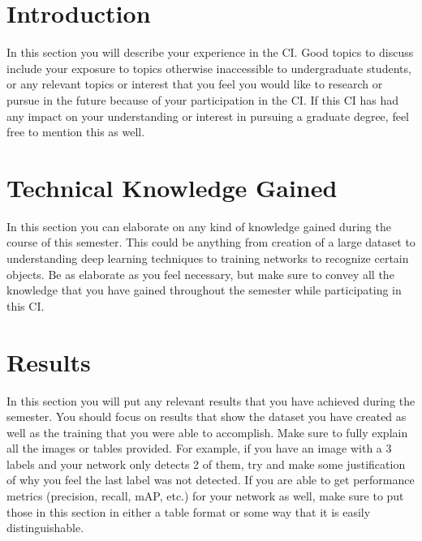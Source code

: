 \thispagestyle{empty}		%

\printtitle					%
\vfill
\printauthor				%
\newpage



\setcounter{page}{1}		%
\section{Introduction}

In this section you will describe your experience in the CI.  Good topics to discuss include your exposure to topics otherwise inaccessible to undergraduate students, or any relevant topics or interest that you feel you would like to research or pursue in the future because of your participation in the CI. If this CI has had any impact on your understanding or interest in pursuing a graduate degree, feel free to mention this as well.

\section{Technical Knowledge Gained}

In this section you can elaborate on any kind of knowledge gained during the course of this semester.  This could be anything from creation of a large dataset to understanding deep learning techniques to training networks to recognize certain objects.  Be as elaborate as you feel necessary, but make sure to convey all the knowledge that you have gained throughout the semester while participating in this CI.

\section{Results}

In this section you will put any relevant results that you have achieved during the semester.  You should focus on results that show the dataset you have created as well as the training that you were able to accomplish.  Make sure to fully explain all the images or tables provided.  For example, if you have an image with a 3 labels and your network only detects 2 of them, try and make some justification of why you feel the last label was not detected.  If you are able to get performance metrics (precision, recall, mAP, etc.) for your network as well, make sure to put those in this section in either a table format or some way that it is easily distinguishable.

